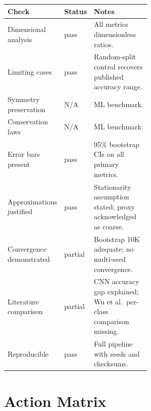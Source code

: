 \documentclass[11pt]{article}
\begin{document}
\begin{tabularx}{\linewidth}{@{}p{0.38\linewidth}p{0.18\linewidth}Y@{}}
\toprule
\textbf{Check} & \textbf{Status} & \textbf{Notes} \\
\midrule
Dimensional analysis & pass & All metrics dimensionless ratios. \\
Limiting cases & pass & Random-split control recovers published accuracy range. \\
Symmetry preservation & N/A & ML benchmark. \\
Conservation laws & N/A & ML benchmark. \\
Error bars present & pass & 95\% bootstrap CIs on all primary metrics. \\
Approximations justified & pass & Stationarity assumption stated; proxy acknowledged as coarse. \\
Convergence demonstrated & partial & Bootstrap 10K adequate; no multi-seed convergence. \\
Literature comparison & partial & CNN accuracy gap explained; Wu et al.\ per-class comparison missing. \\
Reproducible & pass & Full pipeline with seeds and checksums. \\
\bottomrule
\end{tabularx}


\section*{Action Matrix}
\end{document}

